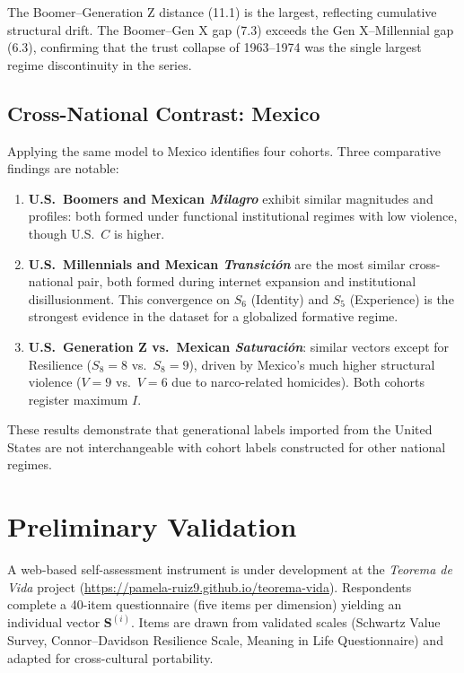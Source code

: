\documentclass[conference]{IEEEtran}
\begin{document}
The Boomer--Generation Z distance (11.1) is the largest, reflecting cumulative structural drift. The Boomer--Gen X gap (7.3) exceeds the Gen X--Millennial gap (6.3), confirming that the trust collapse of 1963--1974 was the single largest regime discontinuity in the series.

\subsection{Cross-National Contrast: Mexico}

Applying the same model to Mexico identifies four cohorts. Three comparative findings are notable:

\begin{enumerate}
  \item \textbf{U.S.\ Boomers and Mexican \textit{Milagro}} exhibit similar magnitudes and profiles: both formed under functional institutional regimes with low violence, though U.S.\ $C$ is higher.
  \item \textbf{U.S.\ Millennials and Mexican \textit{Transici\'on}} are the most similar cross-national pair, both formed during internet expansion and institutional disillusionment. This convergence on $S_6$ (Identity) and $S_5$ (Experience) is the strongest evidence in the dataset for a globalized formative regime.
  \item \textbf{U.S.\ Generation Z vs.\ Mexican \textit{Saturaci\'on}}: similar vectors except for Resilience ($S_8 = 8$ vs.\ $S_8 = 9$), driven by Mexico's much higher structural violence ($V = 9$ vs.\ $V = 6$ due to narco-related homicides). Both cohorts register maximum $I$.
\end{enumerate}

These results demonstrate that generational labels imported from the United States are not interchangeable with cohort labels constructed for other national regimes.

\section{Preliminary Validation}
\label{sec:validation}

A web-based self-assessment instrument is under development at the \textit{Teorema de Vida} project (\url{https://pamela-ruiz9.github.io/teorema-vida}). Respondents complete a 40-item questionnaire (five items per dimension) yielding an individual vector $\mathbf{S}^{(i)}$. Items are drawn from validated scales (Schwartz Value Survey, Connor--Davidson Resilience Scale, Meaning in Life Questionnaire) and adapted for cross-cultural portability.
\end{document}
